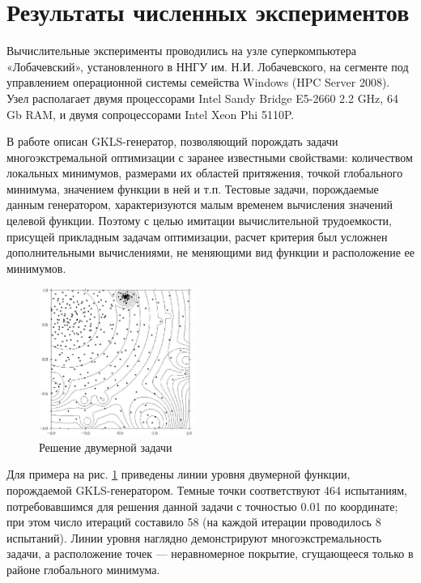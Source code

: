 \documentclass[a4paper]{article}
\begin{document}
\section{Результаты численных экспериментов}
Вычислительные эксперименты проводились на узле суперкомпьютера «Лобачевский», установленного в ННГУ им. Н.И. Лобачевского, на сегменте под управлением операционной системы семейства Windows (HPC Server 2008). Узел располагает двумя процессорами Intel Sandy Bridge E5-2660 2.2 GHz, 64 Gb RAM, и двумя сопроцессорами Intel Xeon Phi 5110P.
\par
В работе \cite{gklsPaper} описан GKLS-генератор, позволяющий порождать задачи многоэкстремальной оптимизации с заранее известными свойствами: количеством локальных минимумов, размерами их областей притяжения, точкой глобального минимума, значением функции в ней и т.п. Тестовые задачи, порождаемые данным генератором, характеризуются малым временем вычисления значений целевой функции. Поэтому с целью имитации вычислительной трудоемкости, присущей прикладным задачам оптимизации, расчет критерия был усложнен дополнительными вычислениями, не меняющими вид функции и расположение ее минимумов.
\begin{figure}[h!]
    \centering
		\includegraphics[width=0.45\textwidth]{isolines.png}
		\caption{Решение двумерной задачи}\label{fig:isolines}
\end{figure}
\par
Для примера на рис. \ref{fig:isolines} приведены линии уровня двумерной функции, порождаемой GKLS-генератором. Темные точки соответствуют 464 испытаниям, потребовавшимся для решения данной задачи с точностью 0.01 по координате; при этом число итераций составило 58 (на каждой итерации проводилось 8 испытаний). Линии уровня наглядно демонстрируют многоэкстремальность задачи, а расположение точек --- неравномерное покрытие, сгущающееся только в районе глобального минимума.
\par
\end{document}
